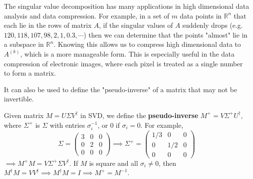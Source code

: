   The singular value decomposition has many applications in high dimensional data analysis and data compression. For example, in a set of $m$ data points in $\mathbb{R}^n$ that each lie in the rows of matrix $A$, if the singular values of $A$ suddenly drops (e.g. $120, 118, 107, 98, 2, 1, 0.3, \cdots$) then we can determine that the points "almost" lie in a subspace in $\mathbb{R}^n$. Knowing this allows us to compress high dimensional data to $A^{(k)}$, which is a more manageable form. This is especially useful in the data compression of electronic images, where each pixel is treated as a single number to form a matrix. 

  It can also be used to define the "pseudo-inverse" of a matrix that may not be invertible. 

  \begin{definition}
    Given matrix $M = U \Sigma V^\dagger$ in SVD, we define the \textbf{pseudo-inverse} $M^+ = V \Sigma^+ U^\dagger$, where $\Sigma^+$ is $\Sigma$ with entries $\sigma_i^{-1}$, or $0$ if $\sigma_i = 0$. For example,
    \begin{equation}
      \Sigma = \begin{pmatrix}3&0&0\\0&2&0\\0&0&0\end{pmatrix} \implies \Sigma^+ = \begin{pmatrix}1/3&0&0\\0&1/2&0\\0&0&0\end{pmatrix}
    \end{equation}
    $\implies M^+ M = V \Sigma^+ \Sigma V^\dagger$. If $M$ is square and all $\sigma_i \neq 0$, then $M^\dagger M = V V^\dagger \implies M^\dagger M = I \implies  M^+ = M^{-1}$. 
  \end{definition}

